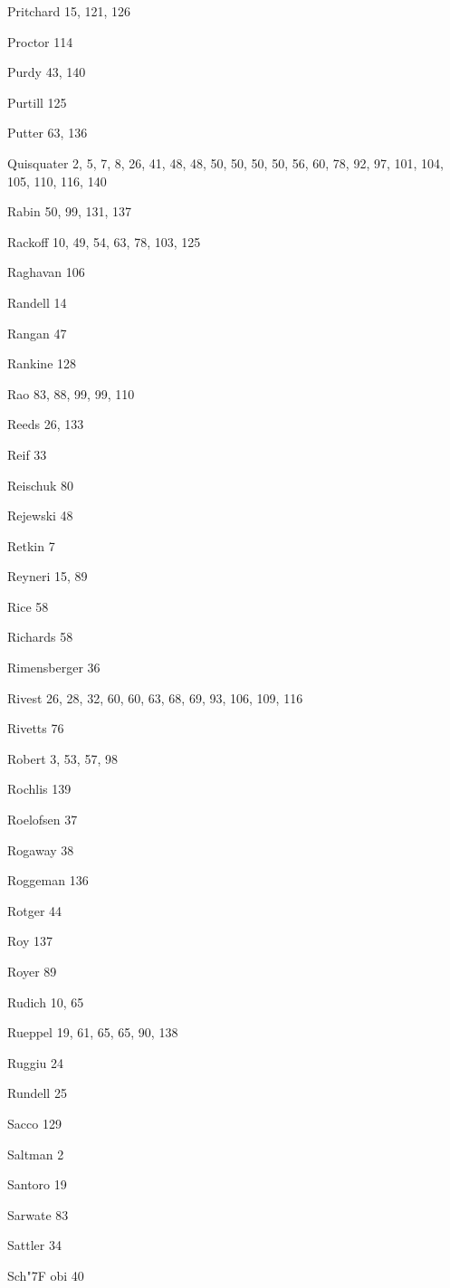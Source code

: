 \begin{theindex}
\item Pritchard 15, 121, 126
\item Proctor 114
\item Purdy 43, 140
\item Purtill 125
\item Putter 63, 136
\item Quisquater 2, 5, 7, 8, 26, 41, 48, 48, 50, 50, 50, 50, 56, 60, 78, 92, 97, 101, 104, 105, 110, 116, 140
\item Rabin 50, 99, 131, 137
\item Rackoff 10, 49, 54, 63, 78, 103, 125
\item Raghavan 106
\item Randell 14
\item Rangan 47
\item Rankine 128
\item Rao 83, 88, 99, 99, 110
\item Reeds 26, 133
\item Reif 33
\item Reischuk 80
\item Rejewski 48
\item Retkin 7
\item Reyneri 15, 89
\item Rice 58
\item Richards 58
\item Rimensberger 36
\item Rivest 26, 28, 32, 60, 60, 63, 68, 69, 93, 106, 109, 116
\item Rivetts 76
\item Robert 3, 53, 57, 98
\item Rochlis 139
\item Roelofsen 37
\item Rogaway 38
\item Roggeman 136
\item Rotger 44
\item Roy 137
\item Royer 89
\item Rudich 10, 65
\item Rueppel 19, 61, 65, 65, 90, 138
\item Ruggiu 24
\item Rundell 25
\item Sacco 129
\item Saltman 2
\item Santoro 19
\item Sarwate 83
\item Sattler 34
\item Sch{\accent "7F o}bi 40

\end{theindex}
